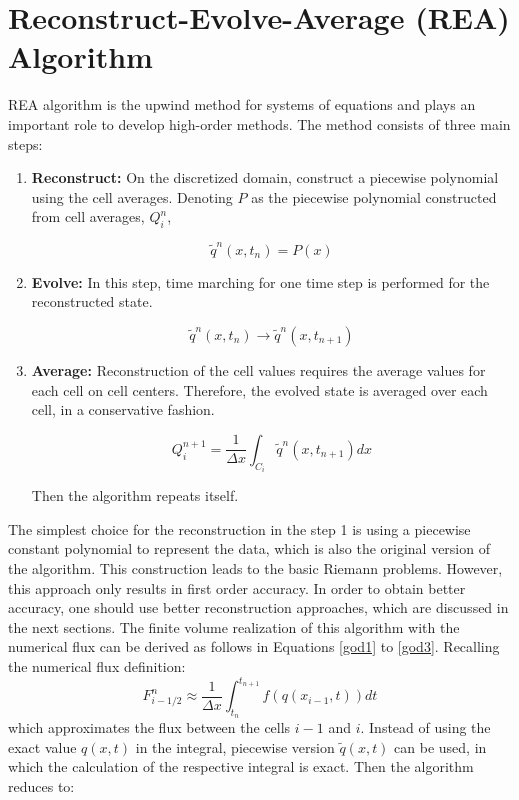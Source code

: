 \documentclass[journal,onecolumn]{IEEEtran}
\begin{document}
\section{Reconstruct-Evolve-Average (REA) Algorithm}
REA algorithm is the upwind method for systems of equations and plays an important role to develop high-order methods. The method consists of three main steps:
\begin{enumerate}
    \item \textbf{Reconstruct:} On the discretized domain, construct a piecewise polynomial using the cell averages. Denoting $P$ as the piecewise polynomial constructed from cell averages, $Q_i^{n}$, 
    
    $$
        \tilde{q}^{n}(x, t_{n}) = P(x)
    $$
    
    \item \textbf{Evolve:} In this step, time marching for one time step is performed for the reconstructed state. 
    
    $$
        \tilde{q}^{n}(x, t_{n}) \longrightarrow \tilde{q}^{n}(x, t_{n+1})
    $$
    
    \item \textbf{Average:} Reconstruction of the cell values requires the average values for each cell on cell centers. Therefore, the evolved state is averaged over each cell, in a conservative fashion. 
    
    $$
        Q_i^{n+1} = \frac{1}{\Delta x}\int_{C_i}  \tilde{q}^{n}(x, t_{n+1}) dx
    $$
    
    Then the algorithm repeats itself.
\end{enumerate}

The simplest choice for the reconstruction in the step 1 is using a piecewise constant polynomial to represent the data, which is also the original version of the algorithm. This construction leads to the basic Riemann problems. However, this approach only results in first order accuracy. In order to obtain better accuracy, one should use better reconstruction approaches, which are discussed in the next sections. The finite volume realization of this algorithm with the numerical flux can be derived as follows in Equations \ref{god1} to \ref{god3}. Recalling the numerical flux definition:
$$
    F_{i-1/2}^n \approx \frac{1}{\Delta x} \int_{t_n}^{t_{n+1}} f(q(x_{i-1}, t))dt
$$
\newline
which approximates the flux between the cells $i-1$ and $i$. Instead of using the exact value $q(x, t)$ in the integral, piecewise version $\tilde{q}(x, t)$ can be used, in which the calculation of the respective integral is exact. Then the algorithm reduces to:
\end{document}
